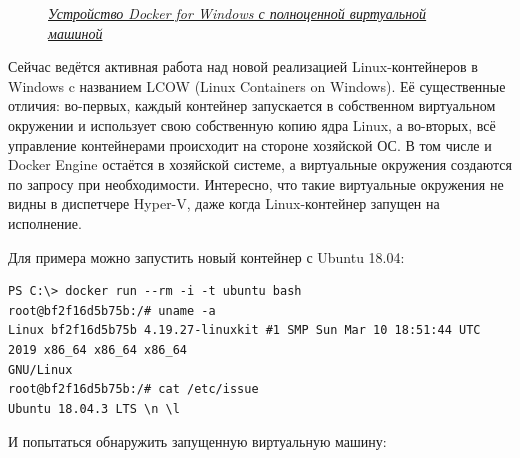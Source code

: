 \documentclass[14pt, a4paper]{article}
\begin{document}
\begin{figure}[H]
    \centering
    \caption*{\textit{\href{https://docs.microsoft.com/en-us/virtualization/windowscontainers/deploy-containers/linux-containers}{Устройство Docker for Windows с полноценной виртуальной машиной}}}
    \label{3.5}
\end{figure}

Сейчас ведётся активная работа над новой реализацией Linux-контейнеров в Windows c названием
LCOW (Linux Containers on Windows). Её существенные отличия: во-первых, каждый контейнер
запускается в собственном виртуальном окружении и использует свою собственную копию ядра Linux,
а во-вторых, всё управление контейнерами происходит на стороне хозяйской ОС. В том числе и
Docker Engine остаётся в хозяйской системе, а виртуальные окружения создаются по запросу при
необходимости. Интересно, что такие виртуальные окружения не видны в диспетчере Hyper-V, даже
когда Linux-контейнер запущен на исполнение.

Для примера можно запустить новый контейнер с Ubuntu 18.04:

\begin{lstlisting}
PS C:\> docker run --rm -i -t ubuntu bash
root@bf2f16d5b75b:/# uname -a
Linux bf2f16d5b75b 4.19.27-linuxkit #1 SMP Sun Mar 10 18:51:44 UTC 2019 x86_64 x86_64 x86_64 
GNU/Linux
root@bf2f16d5b75b:/# cat /etc/issue
Ubuntu 18.04.3 LTS \n \l
\end{lstlisting}

И попытаться обнаружить запущенную виртуальную машину:
\end{document}
